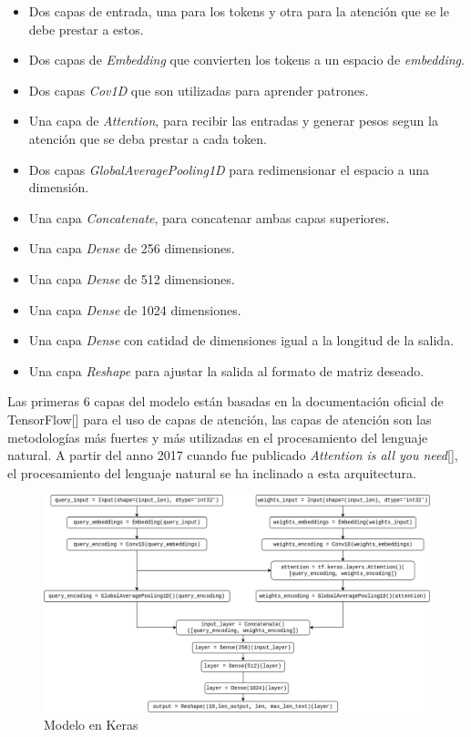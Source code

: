 \begin{itemize}
    \item Dos capas de entrada, una para los tokens y otra para la atención que se le debe prestar a estos.
    \item Dos capas de \textit{Embedding} que convierten los tokens a un espacio de \textit{embedding}.
    \item Dos capas \textit{Cov1D} que son utilizadas para aprender patrones.
    \item Una capa de \textit{Attention}, para recibir las entradas y generar pesos segun la atenci\'on que se deba prestar a cada token.
    \item Dos capas \textit{GlobalAveragePooling1D} para redimensionar el espacio a una dimensión.
    \item Una capa \textit{Concatenate}, para concatenar ambas capas superiores.
    \item Una capa \textit{Dense} de 256 dimensiones.
    \item Una capa \textit{Dense} de 512 dimensiones.
    \item Una capa \textit{Dense} de 1024 dimensiones.
    \item Una capa \textit{Dense} con catidad de dimensiones igual a la longitud de la salida.
    \item Una capa \textit{Reshape} para ajustar la salida al formato de matriz deseado.
\end{itemize}
Las primeras 6 capas del modelo están basadas en la documentación oficial de TensorFlow[\cite{tensorflow}] para el uso de capas de atención, las capas de atenci\'on son las metodolog\'ias m\'as fuertes y m\'as utilizadas en el procesamiento del lenguaje natural. A partir del anno 2017 cuando fue publicado \textit{Attention is all you need}[\cite{transformers}], el procesamiento del lenguaje natural se ha inclinado a esta arquitectura.

\begin{figure}[H]
\centering
 \includegraphics[width=\textwidth]{Graphics/model.png}
 \caption{Modelo en Keras}
 \label{fig:modelo}
\end{figure}


